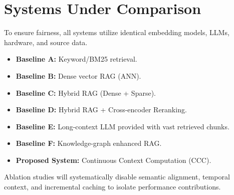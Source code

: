 \section{Systems Under Comparison}
\label{sec:systems}

To ensure fairness, all systems utilize identical embedding models, LLMs, hardware, and source data.
\begin{itemize}
    \item \textbf{Baseline A:} Keyword/BM25 retrieval.
    \item \textbf{Baseline B:} Dense vector RAG (ANN).
    \item \textbf{Baseline C:} Hybrid RAG (Dense + Sparse).
    \item \textbf{Baseline D:} Hybrid RAG + Cross-encoder Reranking.
    \item \textbf{Baseline E:} Long-context LLM provided with vast retrieved chunks.
    \item \textbf{Baseline F:} Knowledge-graph enhanced RAG.
    \item \textbf{Proposed System:} Continuous Context Computation (CCC).
\end{itemize}
Ablation studies will systematically disable semantic alignment, temporal context, and incremental caching to isolate performance contributions.
